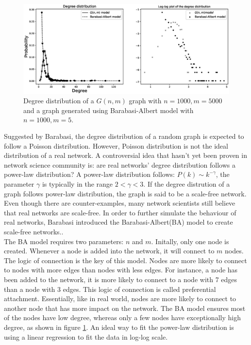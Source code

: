 \documentclass[12pt]{article}
\begin{document}
\begin{figure}[ht]
    \centering
    \includegraphics[width=\textwidth]{degree_distribution.eps}
    \centering
    \caption{Degree distribution of a $G(n,m)$ graph with $n=1000,m=5000$ and a graph generated using Barabasi-Albert model with $n=1000,m=5$.}
    \label{fig:degree_dist}
\end{figure}
\noindent
Suggested by Barabasi\cite{barabási2016network}, the degree distribution of a random graph is expected to follow a Poisson distribution. However, Poisson distribution is not the ideal distribution of a real network. A controversial idea that hasn't yet been proven in network science community is: are real networks' degree distribution follows a power-law distribution? A power-law distribution follows: $P(k) \sim k^{-\gamma }$, the parameter $\gamma$ is typically in the range $2<\gamma<3$. If the degree distrution of a graph follows power-law distribution, the graph is said to be a scale-free network. Even though there are counter-examples\cite{broido_clauset_2019}, many network scientists still believe that real networks are scale-free. In order to further simulate the behaviour of real networks, Barabasi introduced the Barabasi-Albert(BA) model to create scale-free networks.\cite{barabási2016network}.\\
The BA model requires two parameters: $n$ and $m$. Initally, only one node is created. Whenever a node is added into the network, it will connect to $m$ nodes. The logic of connection is the key of this model. Nodes are more likely to connect to nodes with more edges than nodes with less edges. For instance, a node has been added to the network, it is more likely to connect to a node with 7 edges than a node with 3 edges. This logic of connection is called preferential attachment. Essentially, like in real world, nodes are more likely to connect to another node that has more impact on the network.\cite{pa_test} The BA model ensures most of the nodes have low degree, whereas only a few nodes have exceptionally high degree, as shown in figure \ref{fig:degree_dist}. An ideal way to fit the power-law distribution is using a linear regression to fit the data in log-log scale.
\end{document}
